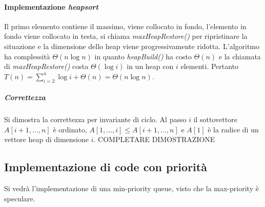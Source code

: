 \paragraph{Implementazione \emph{heapsort}}
Il primo elemento contiene il massimo, viene collocato in fondo, l'elemento in fondo viene collocato in testa, si chiama \emph{maxHeapRestore()} per 
ripristinare la situazione e la dimensione dello heap viene progressivamente ridotta. L'algoritmo ha complessit\`a $\Theta(n\log n)$ in quanto 
\emph{heapBuild()} ha costo $\Theta(n)$ e la chiamata di \emph{maxHeapRestore()} costa $\Theta(\log i)$ in un heap con $i$ elementi. Pertanto 
$T(n)=\sum\limits_{i=2}^n\log i+\Theta(n)=\Theta(n\log n)$.
\begin{algorithm}
\DontPrintSemicolon
{}
\caption{\protect{}}

\;
\end{algorithm}
\subparagraph{Correttezza}
Si dimostra la correttezza per invariante di ciclo. Al passo $i$ il sottovettore $A[i+1,\dots, n]$ \`e ordinato, $A[1,\dots, i]\le A[i+1, \dots, n]$ e 
$A[1]$ \`e la radice di un vettore heap di dimensione $i$. COMPLETARE DIMOSTRAZIONE
\subsection{Implementazione di code con priorit\`a}
Si vedr\`a l'implementazione di una min-priority queue, visto che la max-priority \`e speculare. 
